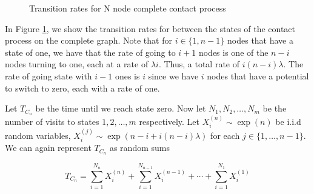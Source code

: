 \documentclass{article}
\theoremstyle{plain}
\theoremstyle{definition}
\theoremstyle{remark}
\numberwithin{equation}{section}
\begin{document}
\begin{figure}[H]
    \centering
    \caption{Transition rates for N node complete contact process}
    \label{fig:complete_contact_n_node_rates}
\end{figure}

In Figure \ref{fig:complete_contact_n_node_rates}, we show the transition rates for between the states of the contact process on the complete graph.
Note that for $i \in \{1, n - 1\} $ nodes that have a state of one, we have that the rate of going to $i + 1$ nodes is one of the $n - i$ nodes turning to one, each at a rate of $\lambda i$.
Thus, a total rate of $i (n - i) \lambda$.
The rate of going state with $i - 1$ ones is $i$ since we have $i$ nodes that have a potential to switch to zero, each with a rate of one.

Let $T_{C_n}$ be the time until we reach state zero.
Now let $N_1, N_2, \ldots, N_m$ be the number of visits to states $1, 2, \ldots, m$ respectively.
Let $X_i^{(n)} \sim \exp(n)$ be i.i.d random variables, $X_i^{(j)} \sim \exp(n - i + i(n - i)\lambda)$ for each $j \in \{1, \ldots, n-1\}$.
We can again represent $T_{C_n}$ as random sums

\begin{equation}\label{eq:wait_contact_sum}
    T_{C_n} = \sum_{i = 1}^{N_n} X_i^{(n)} + \sum_{i = 1}^{N_{n - 1}} X_i^{(n - 1)} + \cdots + \sum_{i = 1}^{N_1} X_i^{(1)}
\end{equation}
\end{document}

